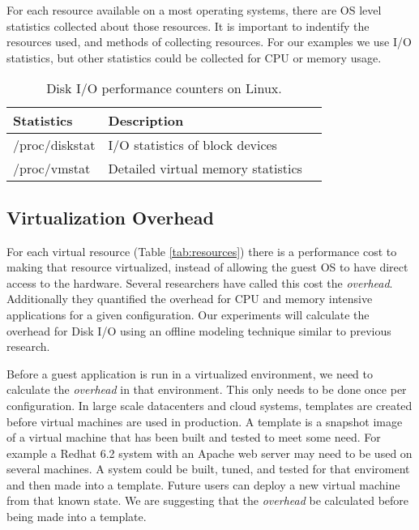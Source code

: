 \indent For each resource available on a most operating systems, there are OS level statistics collected about those resources.  It is important to indentify the resources used, and methods of collecting resources.  
For our examples we use I/O statistics, but other statistics could be collected for CPU or memory usage.

\begin{table}
\begin{tabular}{ l l p{5cm} }
  Statistics & Description \\
  \hline
  /proc/diskstat & I/O statistics of block devices \\
  /proc/vmstat & Detailed virtual memory statistics\\
  \hline
\end{tabular}
\caption{Disk I/O performance counters on Linux.}
\label{tab:iocounters}
\end{table}


\subsection{Virtualization Overhead}
For each virtual resource (Table \ref{tab:resources}) there is a performance cost to making that resource virtualized, instead of allowing the guest OS to have direct access to the hardware.  
Several researchers \cite{cherkasova, huber1} have called this cost the \emph{overhead}.  
Additionally they quantified the overhead for CPU and memory intensive applications for a given configuration.  Our experiments will calculate the overhead for Disk I/O using an offline modeling technique similar to previous research.

\indent Before a guest application is run in a virtualized environment, we need to calculate the \emph{overhead} in that environment.  This only needs to be done once per configuration.  In large scale datacenters and cloud systems, templates are created before virtual machines are used in production.  A template is a snapshot image of a virtual machine that has been built and tested to meet some need.  For example a Redhat 6.2 system with an Apache web server may need to be used on several machines.  A system could be built, tuned, and tested for that enviroment and then made into a template.  Future users can deploy a new virtual machine from that known state.  We are suggesting that the \emph{overhead} be calculated before being made into a template.  

